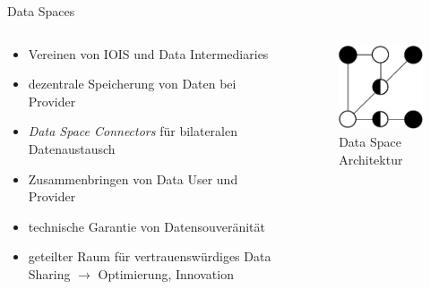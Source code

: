 \begin{frame}{Data Spaces \footnotesize\cite{mollerIndustrialDataEcosystems2024}}
    \begin{columns}
        \begin{column}{0.6\textwidth}
            \begin{itemize}
                \item Vereinen von IOIS und Data Intermediaries
                \item dezentrale Speicherung von Daten bei Provider
                
                \item<2-> \emph{Data Space Connectors} für bilateralen Datenaustausch %
                \item<2-> Zusammenbringen von Data User und Provider %
                
                \item<3-> technische Garantie von Datensouveränität
                \item<3-> geteilter Raum für vertrauenswürdiges Data Sharing $\to$ Optimierung, Innovation
            \end{itemize}
        \end{column}
        
        \begin{column}{0.4\textwidth}
            \begin{figure}
                \includegraphics[height=0.5\textheight]{./assets/data_space_architecture.drawio.pdf}
                \caption{Data Space Architektur}
            \end{figure}
        \end{column}
    \end{columns}
\end{frame}


